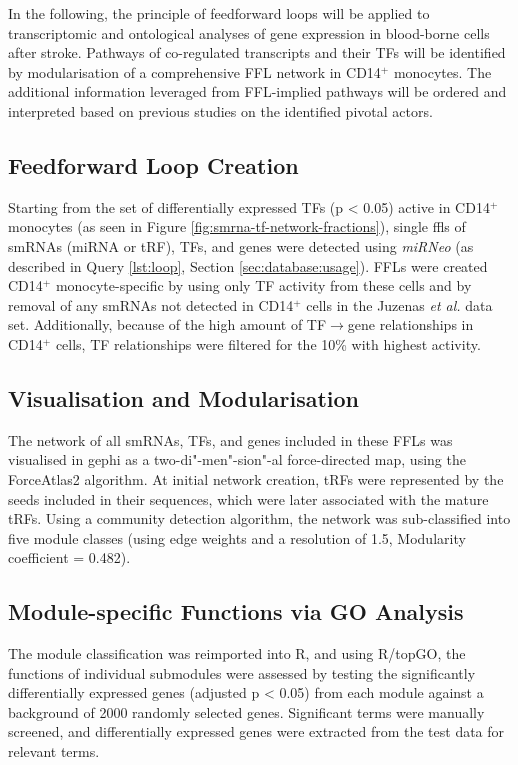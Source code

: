 In the following, the principle of feedforward loops will be applied to transcriptomic and ontological analyses of gene expression in blood-borne cells after stroke. Pathways of co-regulated transcripts and their TFs will be identified by modularisation of a comprehensive FFL network in CD14$^+$ monocytes. The additional information leveraged from FFL-implied pathways will be ordered and interpreted based on previous studies on the identified pivotal actors.

\begin{method}

\subsection{Feedforward Loop Creation}
Starting from the set of differentially expressed TFs (p < 0.05) active in CD14$^+$ monocytes (as seen in Figure \ref{fig:smrna-tf-network-fractions}), single \acfp{ffl} of smRNAs (miRNA or tRF), TFs, and genes were detected using \emph{miRNeo} (as described in Query \ref{lst:loop}, Section \ref{sec:database:usage}). FFLs were created CD14$^+$ monocyte-specific by using only TF activity from these cells and by removal of any smRNAs not detected in CD14$^+$ cells in the Juzenas \emph{et al.}\cite{Juzenas2017} data set. Additionally, because of the high amount of TF$\to$gene relationships in CD14$^+$ cells, TF relationships were filtered for the 10\% with highest activity.

\subsection{Visualisation and Modularisation}
The network of all smRNAs, TFs, and genes included in these FFLs was visualised in gephi\cite{Jacomy2014} as a two-di"-men"-sion"-al force-directed map, using the ForceAtlas2 algorithm. At initial network creation, tRFs were represented by the seeds included in their sequences, which were later associated with the mature tRFs. Using a community detection algorithm,\cite{Blondel2008} the network was sub-classified into five module classes (using edge weights and a resolution of 1.5, Modularity coefficient = 0.482).

\subsection{Module-specific Functions via GO Analysis}
 The module classification was reimported into R, and using R/topGO,\cite{Alexa2006} the functions of individual submodules were assessed by testing the significantly differentially expressed genes (adjusted p < 0.05) from each module against a background of 2000 randomly selected genes. Significant terms were manually screened, and differentially expressed genes were extracted from the test data for relevant terms.

\end{method}

